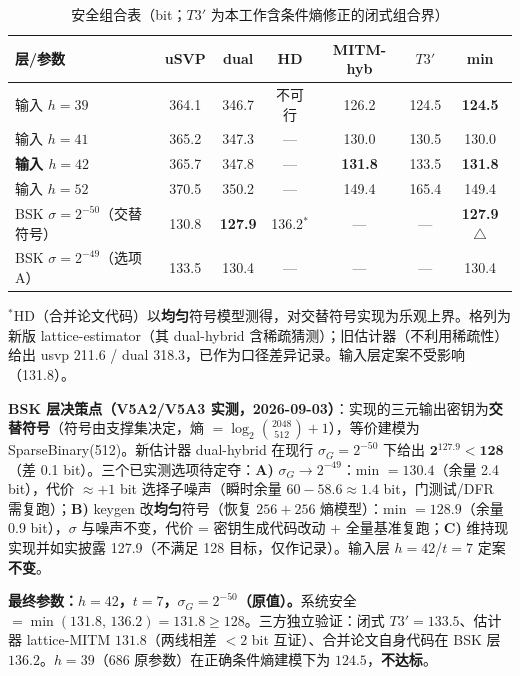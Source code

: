 \documentclass[11pt]{article}
\begin{document}
\begin{table}[htbp]
\centering
\caption{安全组合表（bit；$T3'$ 为本工作含条件熵修正的闭式组合界）}
\label{tab:sec}
\small
\begin{tabular*}{\columnwidth}{@{\extracolsep{\fill}} l ccccc c}
\toprule
层/参数 & uSVP & dual & HD & MITM-hyb & $T3'$ & min \\
\midrule
输入 $h{=}39$ & 364.1 & 346.7 & 不可行 & 126.2 & 124.5 & \textbf{124.5} \\
输入 $h{=}41$ & 365.2 & 347.3 & — & 130.0 & 130.5 & 130.0 \\
\textbf{输入 $h{=}42$} & 365.7 & 347.8 & — & \textbf{131.8} & 133.5 & \textbf{131.8} \\
输入 $h{=}52$ & 370.5 & 350.2 & — & 149.4 & 165.4 & 149.4 \\
BSK $\sigma{=}2^{-50}$（交替符号） & 130.8 & \textbf{127.9} & 136.2$^{*}$ & — & — & \textbf{127.9} $\triangle$ \\
BSK $\sigma{=}2^{-49}$（选项A） & 133.5 & 130.4 & — & — & — & 130.4 \\
\bottomrule
\end{tabular*}
\end{table}

\noindent{}$^{*}$HD（合并论文代码）以\textbf{均匀}符号模型测得，对交替符号实现为乐观上界。格列为新版 lattice-estimator（其 dual-hybrid 含稀疏猜测）；旧估计器（不利用稀疏性）给出 usvp 211.6 / dual 318.3，已作为口径差异记录。输入层定案不受影响（131.8）。

\begin{keybox}[colback=orange!6, colframe=orange!60!black]
\textbf{BSK 层决策点（V5A2/V5A3 实测，2026-09-03）}：实现的三元输出密钥为\textbf{交替符号}（符号由支撑集决定，熵 $=\log_2\binom{2048}{512}+1$），等价建模为 SparseBinary(512)。新估计器 dual-hybrid 在现行 $\sigma_G{=}2^{-50}$ 下给出 $\mathbf{2^{127.9}<128}$（差 0.1 bit）。三个已实测选项待定夺：\textbf{A)} $\sigma_G\to2^{-49}$：min $=130.4$（余量 2.4 bit），代价 $\approx+1$ bit 选择子噪声（瞬时余量 $60-58.6\approx1.4$ bit，门测试/DFR 需复跑）；\textbf{B)} keygen 改\textbf{均匀}符号（恢复 $256{+}256$ 熵模型）：min $=128.9$（余量 0.9 bit），$\sigma$ 与噪声不变，代价 = 密钥生成代码改动 + 全量基准复跑；\textbf{C)} 维持现实现并如实披露 127.9（不满足 128 目标，仅作记录）。输入层 $h{=}42$/$t{=}7$ 定案\textbf{不变}。
\end{keybox}

\begin{keybox}
\textbf{最终参数：$h{=}42$，$t{=}7$，$\sigma_G{=}2^{-50}$（原值）。}系统安全 $=\min(131.8,\,136.2)=131.8\ge 128$。三方独立验证：闭式 $T3'{=}133.5$、估计器 lattice-MITM $131.8$（两线相差 $<2$ bit 互证）、合并论文自身代码在 BSK 层 $136.2$。$h{=}39$（686 原参数）在正确条件熵建模下为 $124.5$，\textbf{不达标}。
\end{keybox}
\end{document}
